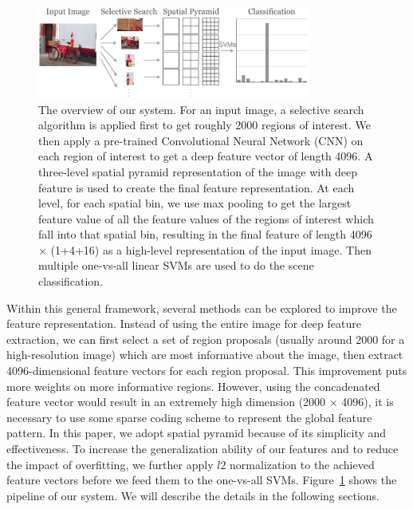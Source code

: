\begin{figure}[ht]
  \centering
  \includegraphics[width=0.8\textwidth]{img/overview.pdf}
  \centering
  \caption{The overview of our system. For an input image, a selective search
  algorithm is applied first to get roughly 2000 regions of interest. We then
  apply a pre-trained Convolutional Neural Network (CNN) on each region of
  interest to get a deep feature vector of length 4096. A three-level spatial
  pyramid representation of the image with deep feature is used to create the
  final feature representation. At each level, for each spatial bin, we use max
  pooling to get the largest feature value of all the feature values of the
  regions of interest which fall into that spatial bin, resulting in the final
  feature of length 4096 $\times$ (1+4+16) as a high-level
  representation of the input image. Then multiple one-vs-all linear SVMs are
  used to do the scene classification.} \label{fig:system_overview}
\end{figure}

Within this general framework, several methods can be explored to improve the
feature representation. Instead of using the entire image for deep feature
extraction, we can first select a set of region proposals (usually around 2000
for a high-resolution image) which are most informative about the image, then
extract 4096-dimensional feature vectors for each region proposal. This
improvement puts more weights on more informative regions. However, using the
concadenated feature vector would result in an extremely high dimension (2000
$\times$ 4096), it is necessary to use some sparse coding scheme to represent
the global feature pattern. In this paper, we adopt spatial pyramid because of
its simplicity and effectiveness. To increase the generalization ability of our
features and to reduce the impact of overfitting, we further apply $l2$
normalization to the achieved feature vectors before we feed them to the
one-vs-all SVMs. Figure~\ref{fig:system_overview} shows the pipeline of our
system. We will describe the details in the following sections.

